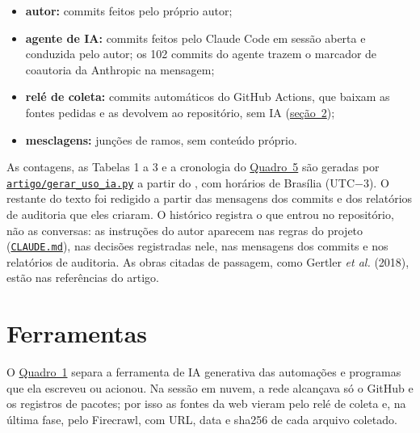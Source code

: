 \documentclass[12pt,a4paper]{article}
\providecommand{\tightlist}{\setlength{\itemsep}{1.5pt}\setlength{\parskip}{0pt}}
\begin{document}
\begin{itemize}
\tightlist
\item
  \textbf{autor:} commits feitos pelo próprio autor;
\item
  \textbf{agente de IA:} commits feitos pelo Claude Code em sessão aberta e conduzida pelo autor; os
  102 commits do agente trazem o marcador de coautoria da Anthropic na mensagem;
\item
  \textbf{relé de coleta:} commits automáticos do GitHub Actions, que baixam as fontes pedidas e as
  devolvem ao repositório, sem IA (\hyperref[secao-2]{seção~2});
\item
  \textbf{mesclagens:} junções de ramos, sem conteúdo próprio.
\end{itemize}

As contagens, as Tabelas 1 a 3 e a cronologia do \hyperref[quadro-5]{Quadro~5} são geradas por
\href{https://github.com/fcarva/aval-pol/blob/50cc9b02b42b52205f650eb6053f63a078e6a387/artigo/gerar_uso_ia.py}{\nolinkurl{artigo/gerar_uso_ia.py}}
a partir do , com horários de Brasília (UTC−3). O restante do texto foi redigido a
partir das mensagens dos commits e dos relatórios de auditoria que eles criaram. O histórico
registra o que entrou no repositório, não as conversas: as instruções do autor aparecem nas regras
do projeto
(\href{https://github.com/fcarva/aval-pol/blob/50cc9b02b42b52205f650eb6053f63a078e6a387/CLAUDE.md}{\nolinkurl{CLAUDE.md}}),
nas decisões registradas nele, nas mensagens dos commits e nos relatórios de auditoria. As obras
citadas de passagem, como Gertler \emph{et al.} (2018), estão nas referências do artigo.

\section{Ferramentas}\label{secao-2}

O \hyperref[quadro-1]{Quadro~1} separa a ferramenta de IA generativa das automações e programas que ela escreveu ou
acionou. Na sessão em nuvem, a rede alcançava só o GitHub e os registros de pacotes; por isso as
fontes da web vieram pelo relé de coleta e, na última fase, pelo Firecrawl, com URL, data e sha256
de cada arquivo coletado.
\end{document}
